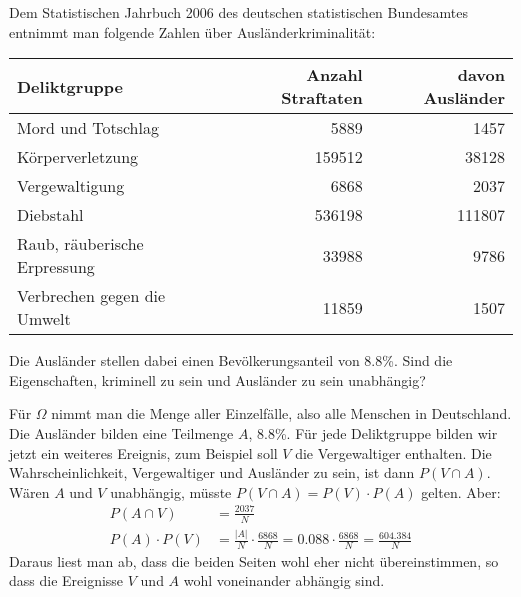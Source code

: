 Dem Statistischen Jahrbuch 2006 des deutschen statistischen Bundesamtes
entnimmt man folgende Zahlen über Ausländerkriminalität:
\begin{center}
\begin{tabular}{|l|r|r|}
\hline
Deliktgruppe&Anzahl Straftaten&davon Ausländer\\
\hline
Mord und Totschlag           &  5889&  1457\\
Körperverletzung            &159512& 38128\\
Vergewaltigung               &  6868&  2037\\
Diebstahl                    &536198&111807\\
Raub, räuberische Erpressung& 33988&  9786\\
Verbrechen gegen die Umwelt  & 11859&  1507\\
\hline
\end{tabular}
\end{center}
Die Ausländer stellen dabei einen Bevölkerungsanteil von 8.8\%.
Sind die Eigenschaften, kriminell zu sein und Ausländer zu sein
unabhängig?

\begin{loesung}
Für $\Omega$ nimmt man die Menge aller Einzelfälle, also alle
Menschen in Deutschland. Die Ausländer bilden eine Teilmenge $A$,
8.8\%. Für jede Deliktgruppe bilden wir jetzt ein weiteres Ereignis,
zum Beispiel soll $V$ die Vergewaltiger enthalten. Die Wahrscheinlichkeit,
Vergewaltiger und Ausländer zu sein, ist dann $P(V\cap A)$. Wären
$A$ und $V$ unabhängig, müsste $P(V\cap A)=P(V)\cdot P(A)$ gelten.
Aber:
\begin{align*}
P(A\cap V)&=\frac{2037}{N}\\
P(A)\cdot P(V)&=\frac{|A|}{N}\cdot\frac{6868}{N}=0.088\cdot \frac{6868}{N}=\frac{604.384}{N}
\end{align*}
Daraus liest man ab, dass die beiden Seiten wohl eher nicht übereinstimmen,
so dass die Ereignisse $V$ und $A$ wohl voneinander abhängig sind.
\end{loesung}



